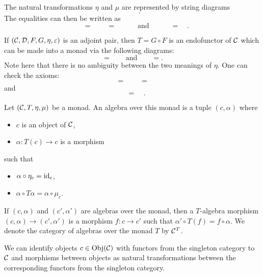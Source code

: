 \documentclass{amsart}
\begin{document}
The natural transformations $\eta$ and $\mu$ are represented by string diagrams
\[
    
    \qquad
    
    .
\]
The equalities can then be written as
\[
    
    \quad
    =
    \quad
    
    \quad
    =
    \quad
    
    \qquad\text{and}\qquad
    
    \quad=\quad
    
    .
\]
\begin{example} \label{monad-from-adjunction}
    If $(\mathcal C, \mathcal D, F, G, \eta, \varepsilon)$ is an adjoint pair, then
        $T=G\circ F$ is an endofunctor of $\mathcal C$
        which can be made into a monad via the following diagrams:
\[
    
    =
    
    \qquad\text{and}\qquad
    
    =
    
    .
\]
Note here that there is no ambiguity between the two meanings of $\eta$.
One can check the axioms:
\[
    
    \quad=\quad
    
    \quad=\quad
    
\]
    and
\[
    
    \quad=\quad
    
    .
\]
\end{example}
\begin{definition}
    Let $(\mathcal C, T,\eta,\mu)$ be a monad.
    An algebra over this monad is a tuple $(c,\alpha)$ where
    \begin{itemize}
        \item $c$ is an object of $\mathcal C$,
        \item $\alpha:T(c)\to c$ is a morphism
    \end{itemize}
        such that
    \begin{itemize}
        \item $\alpha\circ \eta_c=\operatorname{id}_c$,
        \item $\alpha\circ T\alpha=\alpha\circ \mu_c$.
    \end{itemize}
    If $(c,\alpha)$ and $(c',\alpha')$ are algebras over the monad, then a 
        $T$-algebra morphism
        $(c,\alpha)\to (c',\alpha')$ is a morphism $f:c\to c'$
        such that $\alpha' \circ T(f)= f\circ \alpha$.
    We denote the category of algebras over the monad $T$ by $\mathcal C^T$.
\end{definition}
We can identify objects $c\in \operatorname{Obj}(\mathcal C)$ with functors from the singleton
    category to $\mathcal C$ and
    morphisms between objects as natural transformations between the corresponding
    functors from the singleton category.
\end{document}
